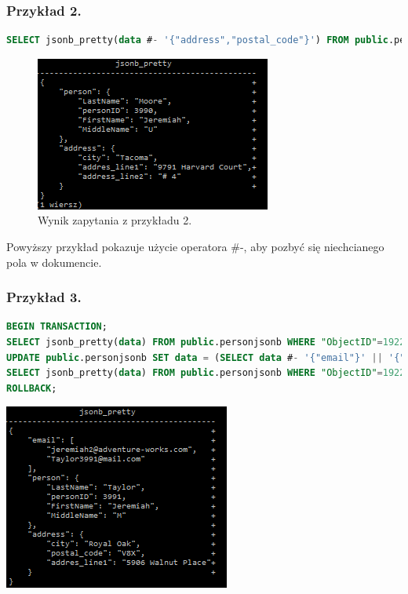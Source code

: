 \documentclass[a4paper,12pt,table]{article}
\begin{document}
{\subsubsection*{Przykład 2.}
\begin{lstlisting}[language=SQL,basicstyle=\footnotesize]
SELECT jsonb_pretty(data #- '{"address","postal_code"}') FROM public.personjsonb WHERE "ObjectID"=1921;
\end{lstlisting}
\vspace{0.5cm}
\begin{figure}[h]
\begin{center}
\includegraphics[scale=1]{sc/24}
\end{center}
\caption{Wynik zapytania z przykładu 2.}
\end{figure}%
Powyższy przykład pokazuje użycie operatora \#-, aby pozbyć się niechcianego pola w dokumencie.\newpage
\subsubsection*{Przykład 3.}
\begin{lstlisting}[language=SQL,basicstyle=\footnotesize]
BEGIN TRANSACTION;
SELECT jsonb_pretty(data) FROM public.personjsonb WHERE "ObjectID"=1922;
UPDATE public.personjsonb SET data = (SELECT data #- '{"email"}' || '{"email": ["newmail@hotmail.com"]}'::jsonb  FROM public.personjsonb WHERE "ObjectID"=1922) WHERE "ObjectID"=1922;
SELECT jsonb_pretty(data) FROM public.personjsonb WHERE "ObjectID"=1922;
ROLLBACK;
\end{lstlisting}
\vspace{0.65cm}
\begin{minipage}{0.5\textwidth}
\makeatletter
\def\@captype{figure}
\makeatother
\begin{center}
\includegraphics[scale=1]{sc/25}
\caption{Przed modyfikacją}
\end{center}


\end{minipage}}
\end{document}
